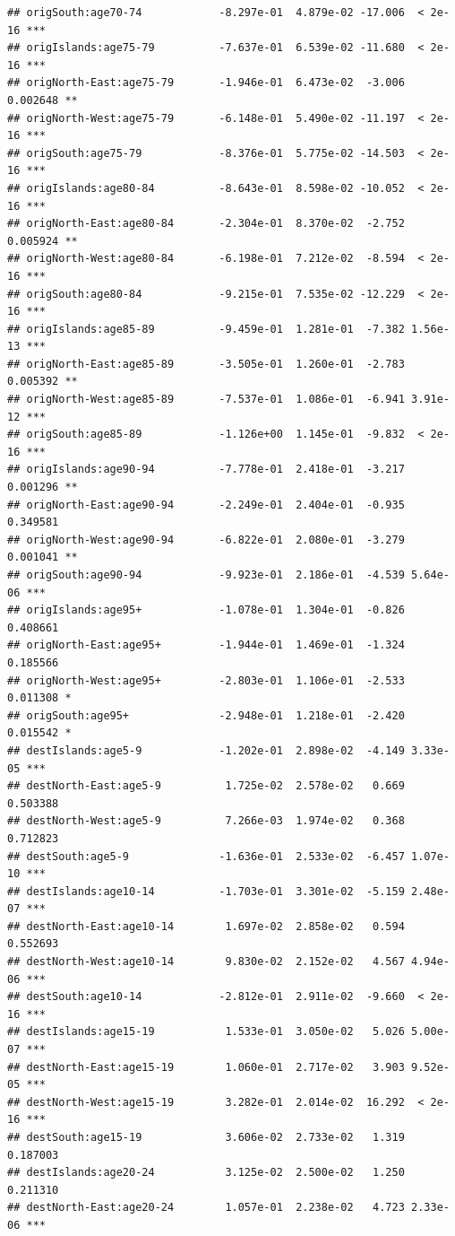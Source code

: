 \documentclass[
]{book}
\begin{document}
\begin{verbatim}
## origSouth:age70-74            -8.297e-01  4.879e-02 -17.006  < 2e-16 ***
## origIslands:age75-79          -7.637e-01  6.539e-02 -11.680  < 2e-16 ***
## origNorth-East:age75-79       -1.946e-01  6.473e-02  -3.006 0.002648 ** 
## origNorth-West:age75-79       -6.148e-01  5.490e-02 -11.197  < 2e-16 ***
## origSouth:age75-79            -8.376e-01  5.775e-02 -14.503  < 2e-16 ***
## origIslands:age80-84          -8.643e-01  8.598e-02 -10.052  < 2e-16 ***
## origNorth-East:age80-84       -2.304e-01  8.370e-02  -2.752 0.005924 ** 
## origNorth-West:age80-84       -6.198e-01  7.212e-02  -8.594  < 2e-16 ***
## origSouth:age80-84            -9.215e-01  7.535e-02 -12.229  < 2e-16 ***
## origIslands:age85-89          -9.459e-01  1.281e-01  -7.382 1.56e-13 ***
## origNorth-East:age85-89       -3.505e-01  1.260e-01  -2.783 0.005392 ** 
## origNorth-West:age85-89       -7.537e-01  1.086e-01  -6.941 3.91e-12 ***
## origSouth:age85-89            -1.126e+00  1.145e-01  -9.832  < 2e-16 ***
## origIslands:age90-94          -7.778e-01  2.418e-01  -3.217 0.001296 ** 
## origNorth-East:age90-94       -2.249e-01  2.404e-01  -0.935 0.349581    
## origNorth-West:age90-94       -6.822e-01  2.080e-01  -3.279 0.001041 ** 
## origSouth:age90-94            -9.923e-01  2.186e-01  -4.539 5.64e-06 ***
## origIslands:age95+            -1.078e-01  1.304e-01  -0.826 0.408661    
## origNorth-East:age95+         -1.944e-01  1.469e-01  -1.324 0.185566    
## origNorth-West:age95+         -2.803e-01  1.106e-01  -2.533 0.011308 *  
## origSouth:age95+              -2.948e-01  1.218e-01  -2.420 0.015542 *  
## destIslands:age5-9            -1.202e-01  2.898e-02  -4.149 3.33e-05 ***
## destNorth-East:age5-9          1.725e-02  2.578e-02   0.669 0.503388    
## destNorth-West:age5-9          7.266e-03  1.974e-02   0.368 0.712823    
## destSouth:age5-9              -1.636e-01  2.533e-02  -6.457 1.07e-10 ***
## destIslands:age10-14          -1.703e-01  3.301e-02  -5.159 2.48e-07 ***
## destNorth-East:age10-14        1.697e-02  2.858e-02   0.594 0.552693    
## destNorth-West:age10-14        9.830e-02  2.152e-02   4.567 4.94e-06 ***
## destSouth:age10-14            -2.812e-01  2.911e-02  -9.660  < 2e-16 ***
## destIslands:age15-19           1.533e-01  3.050e-02   5.026 5.00e-07 ***
## destNorth-East:age15-19        1.060e-01  2.717e-02   3.903 9.52e-05 ***
## destNorth-West:age15-19        3.282e-01  2.014e-02  16.292  < 2e-16 ***
## destSouth:age15-19             3.606e-02  2.733e-02   1.319 0.187003    
## destIslands:age20-24           3.125e-02  2.500e-02   1.250 0.211310    
## destNorth-East:age20-24        1.057e-01  2.238e-02   4.723 2.33e-06 ***

\end{verbatim}
\end{document}
